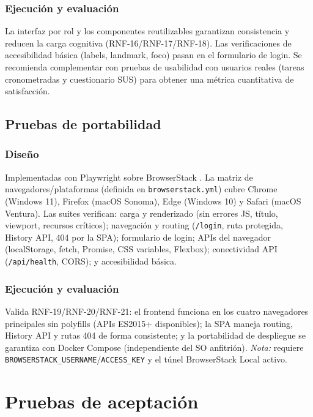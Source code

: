 \documentclass[stu,11pt,floatsintext]{apa7}
\begin{document}
\subsubsection{Ejecución y evaluación}
La interfaz por rol y los componentes reutilizables garantizan consistencia y reducen la
carga cognitiva (RNF-16/RNF-17/RNF-18). Las verificaciones de accesibilidad básica
(labels, landmark, foco) pasan en el formulario de login. Se recomienda complementar con
pruebas de usabilidad con usuarios reales (tareas cronometradas y cuestionario SUS) para
obtener una métrica cuantitativa de satisfacción.

\subsection{Pruebas de portabilidad}

\subsubsection{Diseño}
Implementadas con Playwright sobre BrowserStack \parencite{playwright}. La matriz de
navegadores/plataformas (definida en \texttt{browserstack.yml}) cubre Chrome (Windows
11), Firefox (macOS Sonoma), Edge (Windows 10) y Safari (macOS Ventura). Las suites
verifican: carga y renderizado (sin errores JS, título, viewport, recursos críticos);
navegación y routing (\texttt{/login}, ruta protegida, History API, 404 por la SPA);
formulario de login; APIs del navegador (localStorage, fetch, Promise, CSS variables,
Flexbox); conectividad API (\texttt{/api/health}, CORS); y accesibilidad básica.

\subsubsection{Ejecución y evaluación}
Valida RNF-19/RNF-20/RNF-21: el frontend funciona en los cuatro navegadores principales
sin polyfills (APIs ES2015+ disponibles); la SPA maneja routing, History API y rutas 404
de forma consistente; y la portabilidad de despliegue se garantiza con Docker Compose
(independiente del SO anfitrión). \emph{Nota:} requiere
\texttt{BROWSERSTACK\_USERNAME}/\texttt{ACCESS\_KEY} y el túnel BrowserStack Local activo.

\section{Pruebas de aceptación}
\end{document}
